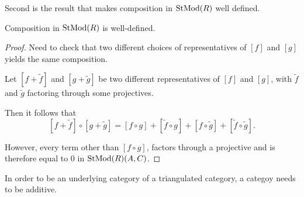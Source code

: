Second is the result that makes composition in \( \operatorname{StMod}(R) \) well defined.

\begin{lemma}
    \label{lem:stmod_composition_well-defined}
    Composition in \( \operatorname{StMod}(R) \) is well-defined.
\end{lemma}
\begin{proof}
    Need to check that two different choices of representatives of \( [f] \) and \( [g] \) yields the same composition.

    Let \( [f + \widetilde{f}] \) and \( [g + \widetilde{g}] \) be two different representatives of \( [f] \) and \( [g] \), with \( \widetilde{f} \) and \( \widetilde{g} \) factoring through some projectives.

    Then it follows that
    \[
        [f + \widetilde{f}] \circ [g + \widetilde{g}] = [f \circ g] + [\widetilde{f} \circ g] + [f \circ \widetilde{g}] + [\widetilde{f} \circ \widetilde{g}].
    \]
    
    However, every term other than \( [f \circ g] \), factors through a projective and is therefore equal to \( 0 \) in \( \operatorname{StMod}(R)(A, C) \).
\end{proof}

In order to be an underlying category of a triangulated category, a categoy needs to be additive.

